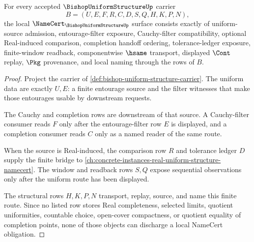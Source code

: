 \begin{theorem}
\label{thm:bishop-uniform-structure-namecert-obligations}
For every accepted $\BishopUniformStructureUp$ carrier
$$
B=(U,E,F,R,C,D,S,Q,H,K,P,N),
$$
the local $\NameCert_{\BishopUniformStructureUp}$ surface consists exactly of uniform-source admission, entourage-filter exposure, Cauchy-filter compatibility, optional Real-induced comparison, completion handoff ordering, tolerance-ledger exposure, finite-window readback, componentwise $\hsame$ transport, displayed $\Cont$ replay, $\Pkg$ provenance, and local naming through the rows of $B$.
\end{theorem}
\begin{proof}
Project the carrier of \autoref{def:bishop-uniform-structure-carrier}. The uniform data are exactly $U,E$: a finite entourage source and the filter witnesses that make those entourages usable by downstream requests.

The Cauchy and completion rows are downstream of that source. A Cauchy-filter consumer reads $F$ only after the entourage-filter row $E$ is displayed, and a completion consumer reads $C$ only as a named reader of the same route.

When the source is Real-induced, the comparison row $R$ and tolerance ledger $D$ supply the finite bridge to \autoref{ch:concrete-instances-real-uniform-structure-namecert}. The window and readback rows $S,Q$ expose sequential observations only after the uniform route has been displayed.

The structural rows $H,K,P,N$ transport, replay, source, and name this finite route. Since no listed row stores Real completeness, selected limits, quotient uniformities, countable choice, open-cover compactness, or quotient equality of completion points, none of those objects can discharge a local NameCert obligation.
\end{proof}


